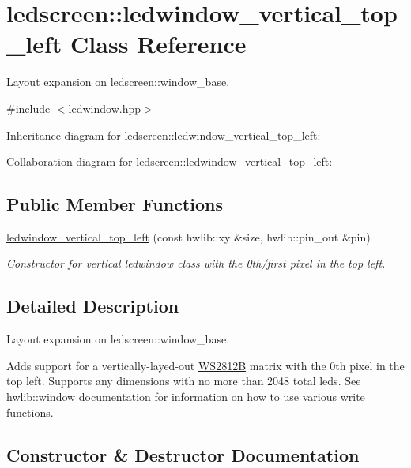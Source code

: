 \hypertarget{classledscreen_1_1ledwindow__vertical__top__left}{}\section{ledscreen\+:\+:ledwindow\+\_\+vertical\+\_\+top\+\_\+left Class Reference}
\label{classledscreen_1_1ledwindow__vertical__top__left}


Layout expansion on ledscreen\+::window\+\_\+base.  




{\ttfamily \#include $<$ledwindow.\+hpp$>$}



Inheritance diagram for ledscreen\+:\+:ledwindow\+\_\+vertical\+\_\+top\+\_\+left\+:


Collaboration diagram for ledscreen\+:\+:ledwindow\+\_\+vertical\+\_\+top\+\_\+left\+:
\subsection*{Public Member Functions}
\begin{DoxyCompactItemize}
\item 
\hyperlink{classledscreen_1_1ledwindow__vertical__top__left_ab5b9d5573577404687cd53fede9e5622}{ledwindow\+\_\+vertical\+\_\+top\+\_\+left} (const hwlib\+::xy \&size, hwlib\+::pin\+\_\+out \&pin)
\begin{DoxyCompactList}\small\item\em Constructor for vertical ledwindow class with the 0th/first pixel in the top left. \end{DoxyCompactList}\end{DoxyCompactItemize}


\subsection{Detailed Description}
Layout expansion on ledscreen\+::window\+\_\+base. 

Adds support for a vertically-\/layed-\/out \hyperlink{classledscreen_1_1WS2812B}{W\+S2812B} matrix with the 0th pixel in the top left. Supports any dimensions with no more than 2048 total leds. See hwlib\+::window documentation for information on how to use various write functions. 

\subsection{Constructor \& Destructor Documentation}
\mbox{\label{classledscreen_1_1ledwindow__vertical__top__left_ab5b9d5573577404687cd53fede9e5622}} 
